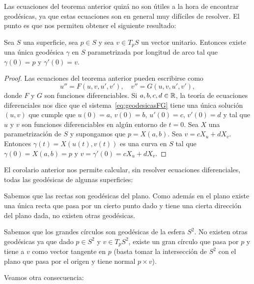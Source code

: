 Las ecuaciones del teorema anterior quizá no son útiles a la hora de encontrar
geodésicas, ya que estas ecuaciones son en general muy difíciles de resolver.
El punto es que nos permiten obtener el siguiente resultado:

\begin{corollary}
	Sea $S$ una superficie, sea $p\in S$ y sea $v\in T_pS$ un vector unitario.
	Entonces existe una única geodésica $\gamma$ en $S$ parametrizada por
	longitud de arco tal que $\gamma(0)=p$ y $\gamma'(0)=v$. 
\end{corollary}

\begin{proof}
	Las ecuaciones del teorema anterior pueden escribirse como
	\begin{equation}
		\label{eq:geodesicasFG}
		u''=F(u,v,u',v'),\quad
		v''=G(u,v,u',v'),
	\end{equation}
	donde $F$ y $G$ son funciones diferenciables. Si $a,b,c,d\in\mathbb{R}$, la teoría
	de ecuaciones diferenciales nos dice que el sistema~\eqref{eq:geodesicasFG}
	tiene una única solución $(u,v)$ que cumple que $u(0)=a$, $v(0)=b$, $u'(0)=c$,
	$v'(0)=d$ y tal que $u$ y $v$ son funciones diferenciables en algún entorno
	de $t=0$. Sea $X$ una parametrización de $S$ y supongamos que $p=X(a,b)$. 
	Sea $v=cX_u+dX_v$. Entonces
	$\gamma(t)=X(u(t),v(t))$ es una curva en $S$ tal que $\gamma(0)=X(a,b)=p$ y
	$v=\gamma'(0)=cX_u+dX_v$.
\end{proof}

El corolario anterior nos permite calcular, sin resolver ecuaciones
diferenciales, todas las geodésicas de algunas superficies: 

\begin{example}
	Sabemos que las rectas son geodésicas del plano. Como además  en el plano
	existe una única recta que pasa por un cierto punto dado y tiene una cierta
	dirección del plano dada, no existen otras geodésicas.
\end{example}

\begin{example}
	Sabemos que los grandes círculos son geodésicas de la esfera $S^2$. No
	existen otras geodésicas ya que dado $p\in S^2$ y $v\in T_pS^2$, existe un
	gran círculo que pasa por $p$ y tiene a $v$ como vector tangente en $p$
	(basta tomar la intersección de $S^2$ con el plano que pasa por el origen y
	tiene normal $p\times v$). 
\end{example}

Veamos otra consecuencia:

